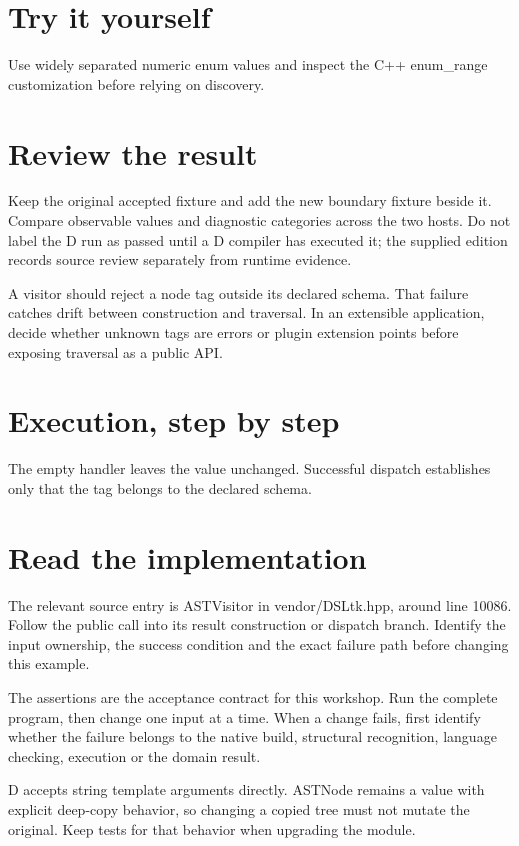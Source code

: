 \section*{Try it yourself}
Use widely separated numeric enum values and inspect the C++ enum\_range customization before relying on discovery.

\section*{Review the result}
Keep the original accepted fixture and add the new boundary fixture beside it. Compare observable values and diagnostic categories across the two hosts. Do not label the D run as passed until a D compiler has executed it; the supplied edition records source review separately from runtime evidence.

\clearpage
{}
A visitor should reject a node tag outside its declared schema. That failure catches drift between construction and traversal. In an extensible application, decide whether unknown tags are errors or plugin extension points before exposing traversal as a public API.


\section*{Execution, step by step}
The empty handler leaves the value unchanged. Successful dispatch establishes only that the tag belongs to the declared schema.

\section*{Read the implementation}
The relevant source entry is ASTVisitor in vendor/DSLtk.hpp, around line 10086. Follow the public call into its result construction or dispatch branch. Identify the input ownership, the success condition and the exact failure path before changing this example.

The assertions are the acceptance contract for this workshop. Run the complete program, then change one input at a time. When a change fails, first identify whether the failure belongs to the native build, structural recognition, language checking, execution or the domain result.

\clearpage
{}
D accepts string template arguments directly. ASTNode remains a value with explicit deep-copy behavior, so changing a copied tree must not mutate the original. Keep tests for that behavior when upgrading the module.

